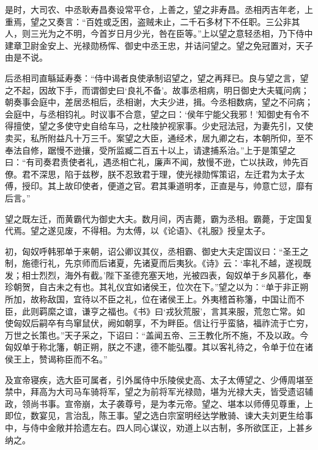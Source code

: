 \documentclass[12pt,UTF8]{ctexbook}
\begin{document}
是时，大司农、中丞耿寿昌奏设常平仓，上善之，望之非寿昌。丞相丙吉年老，上重焉，望之又奏言：“百姓或乏困，盗贼未止，二千石多材下不任职。三公非其人，则三光为之不明，今首岁日月少光，咎在臣等。”上以望之意轻丞相，乃下侍中建章卫尉金安上、光禄勋杨恽、御史中丞王忠，并诘问望之。望之免冠置对，天子由是不说。



后丞相司直緐延寿奏：“侍中谒者良使承制诏望之，望之再拜已。良与望之言，望之不起，因故下手，而谓御史曰‘良礼不备’。故事丞相病，明日御史大夫辄问病；朝奏事会庭中，差居丞相后，丞相谢，大夫少进，揖。今丞相数病，望之不问病；会庭中，与丞相钧礼。时议事不合意，望之曰：‘侯年宁能父我邪！’知御史有令不得擅使，望之多使守史自给车马，之杜陵护视家事。少史冠法冠，为妻先引，又使卖买，私所附益凡十万三千。案望之大臣，通经术，居九卿之右，本朝所仰，至不奉法自修，踞慢不逊攘，受所监臧二百五十以上，请逮捕系治。”上于是策望之曰：“有司奏君责使者礼，遇丞相亡礼，廉声不闻，敖慢不逊，亡以扶政，帅先百僚。君不深思，陷于兹秽，朕不忍致君于理，使光禄勋恽策诏，左迁君为太子太傅，授印。其上故印使者，便道之官。君其秉道明孝，正直是与，帅意亡愆，靡有后言。”



望之既左迁，而黄霸代为御史大夫。数月间，丙吉薨，霸为丞相。霸薨，于定国复代焉。望之遂见废，不得相。为太傅，以《论语》、《礼服》授皇太子。



初，匈奴呼韩邪单于来朝，诏公卿议其仪，丞相霸、御史大夫定国议曰：“圣王之制，施德行礼，先京师而后诸夏，先诸夏而后夷狄。《诗》云：‘率礼不越，遂视既发；相士烈烈，海外有截。’陛下圣德充塞天地，光被四表，匈奴单于乡风慕化，奉珍朝贺，自古未之有也。其礼仪宜如诸侯王，位次在下。”望之以为：“单于非正朔所加，故称敌国，宜待以不臣之礼，位在诸侯王上。外夷稽首称籓，中国让而不臣，此则羁縻之谊，谦亨之福也。《书》曰‘戎狄荒服’，言其来服，荒忽亡常。如使匈奴后嗣卒有鸟窜鼠伏，阙如朝享，不为畔臣。信让行乎蛮貉，福祚流于亡穷，万世之长策也。”天子采之，下诏曰：“盖闻五帝、三王教化所不施，不及以政。今匈奴单于称北籓，朝正朔，朕之不逮，德不能弘覆。其以客礼待之，令单于位在诸侯王上，赞谒称臣而不名。”



及宣帝寝疾，选大臣可属者，引外属侍中乐陵侯史高、太子太傅望之、少傅周堪至禁中，拜高为大司马车骑将军，望之为前将军光禄勋，堪为光禄大夫，皆受遗诏辅政，领尚书事。宣帝崩，太子袭尊号，是为孝元帝。望之、堪本以师傅见尊重，上即位，数宴见，言治乱，陈王事。望之选白宗室明经达学散骑、谏大夫刘更生给事中，与侍中金敞并拾遗左右。四人同心谋议，劝道上以古制，多所欲匡正，上甚乡纳之。
\end{document}

